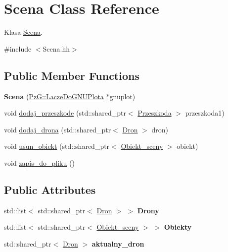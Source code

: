 \hypertarget{class_scena}{}\section{Scena Class Reference}
\label{class_scena}


Klasa \mbox{\hyperlink{class_scena}{Scena}}.  




{\ttfamily \#include $<$Scena.\+hh$>$}

\subsection*{Public Member Functions}
\begin{DoxyCompactItemize}
\item 
\mbox{\label{class_scena_ad42e66ff066ebf2cee29a9ec22b83ec2}} 
{\bfseries Scena} (\mbox{\hyperlink{class_pz_g_1_1_lacze_do_g_n_u_plota}{Pz\+G\+::\+Lacze\+Do\+G\+N\+U\+Plota}} $\ast$gnuplot)
\item 
void \mbox{\hyperlink{class_scena_adaa6deabe2da0a2303100eb10ee1a44c}{dodaj\+\_\+przeszkode}} (std\+::shared\+\_\+ptr$<$ \mbox{\hyperlink{class_przeszkoda}{Przeszkoda}} $>$ przeszkoda1)
\item 
void \mbox{\hyperlink{class_scena_a22103722367c966c09d29ecf32c047ce}{dodaj\+\_\+drona}} (std\+::shared\+\_\+ptr$<$ \mbox{\hyperlink{class_dron}{Dron}} $>$ dron)
\item 
void \mbox{\hyperlink{class_scena_a6d75136075e1d0c562e77b8548b3e621}{usun\+\_\+obiekt}} (std\+::shared\+\_\+ptr$<$ \mbox{\hyperlink{class_obiekt__sceny}{Obiekt\+\_\+sceny}} $>$ obiekt)
\item 
void \mbox{\hyperlink{class_scena_a52ce6283ef4e38d47d4332230172b5eb}{zapis\+\_\+do\+\_\+pliku}} ()
\end{DoxyCompactItemize}
\subsection*{Public Attributes}
\begin{DoxyCompactItemize}
\item 
\mbox{\label{class_scena_a5e4789117c6d95f061954a483a29d276}} 
std\+::list$<$ std\+::shared\+\_\+ptr$<$ \mbox{\hyperlink{class_dron}{Dron}} $>$ $>$ {\bfseries Drony}
\item 
\mbox{\label{class_scena_ac3ee85364cce227058a14d110f9c05af}} 
std\+::list$<$ std\+::shared\+\_\+ptr$<$ \mbox{\hyperlink{class_obiekt__sceny}{Obiekt\+\_\+sceny}} $>$ $>$ {\bfseries Obiekty}
\item 
\mbox{\label{class_scena_ad4b371bf6235f24cf5bfacb3a90b9060}} 
std\+::shared\+\_\+ptr$<$ \mbox{\hyperlink{class_dron}{Dron}} $>$ {\bfseries aktualny\+\_\+dron}
\end{DoxyCompactItemize}



